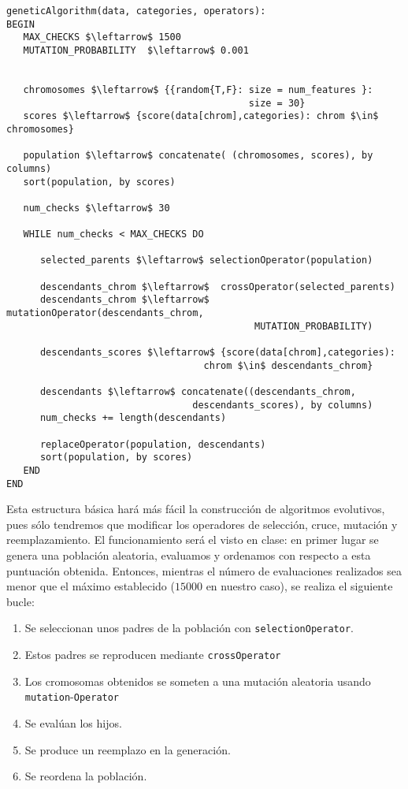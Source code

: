 \documentclass[11pt,leqno]{article}
\begin{document}
\begin{lstlisting}[mathescape=true]
geneticAlgorithm(data, categories, operators):
BEGIN
   MAX_CHECKS $\leftarrow$ 1500
   MUTATION_PROBABILITY  $\leftarrow$ 0.001
   

   chromosomes $\leftarrow$ {{random{T,F}: size = num_features }:
                                           size = 30}
   scores $\leftarrow$ {score(data[chrom],categories): chrom $\in$ chromosomes} 
   
   population $\leftarrow$ concatenate( (chromosomes, scores), by columns)
   sort(population, by scores)
   
   num_checks $\leftarrow$ 30
   
   WHILE num_checks < MAX_CHECKS DO
   
      selected_parents $\leftarrow$ selectionOperator(population)
      
      descendants_chrom $\leftarrow$  crossOperator(selected_parents)
      descendants_chrom $\leftarrow$ mutationOperator(descendants_chrom,
                                            MUTATION_PROBABILITY)
                                                      
      descendants_scores $\leftarrow$ {score(data[chrom],categories): 
                                   chrom $\in$ descendants_chrom} 
                                           
      descendants $\leftarrow$ concatenate((descendants_chrom,
                                 descendants_scores), by columns)
      num_checks += length(descendants)
                                                
      replaceOperator(population, descendants)
      sort(population, by scores)
   END
END
\end{lstlisting}	

	Esta estructura básica hará más fácil la construcción de algoritmos evolutivos, pues sólo tendremos que modificar los operadores de selección, cruce, mutación y reemplazamiento. El funcionamiento será el visto en clase: en primer lugar se genera una población aleatoria, evaluamos y ordenamos con respecto a esta puntuación obtenida. Entonces, mientras el número de evaluaciones realizados sea menor que el máximo establecido ($15000$ en nuestro caso), se realiza el siguiente bucle:
	
\begin{enumerate}[i]
\item Se seleccionan unos padres de la población con \texttt{selectionOperator}.
\item Estos padres se reproducen mediante \texttt{crossOperator}
\item Los cromosomas obtenidos se someten a una mutación aleatoria usando \texttt{mutation}-\texttt{Operator}
\item Se evalúan los hijos.
\item Se produce un reemplazo en la generación.
\item Se reordena la población.
\end{enumerate}
\end{document}
